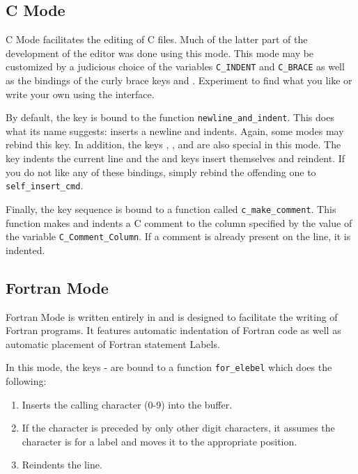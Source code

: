 \subsection{C Mode}

  C Mode facilitates the editing of C files.  Much of the latter part of the
  development of the \jed{} editor was done using this mode.  This mode may be
  customized by a judicious choice of the variables \verb|C_INDENT| and
  \verb|C_BRACE| as well as the bindings of the curly brace keys \var{\{} 
  and \key{\}}.  Experiment to find what you like or write your own using the
  \slang{} interface.

  By default, the  key is bound to the function
  \verb|newline_and_indent|. This does what its name suggests: inserts a
  newline and indents.  Again, some modes may rebind this key.  In addition,
  the keys \var{\{}, \var{\}}, and  are also special in this mode.
  The  key indents the current line and the \var{\{} and \var{\}}
  keys insert themselves and reindent.  If you do not like any of these
  bindings, simply rebind the offending one to \verb|self_insert_cmd|.

  Finally, the key sequence  is bound to a function called
  \verb|c_make_comment|.  This function makes and indents a C comment to the
  column specified by the value of the variable \verb|C_Comment_Column|.  If
  a comment is already present on the line, it is indented.

\subsection{Fortran Mode}

  Fortran Mode is written entirely in \slang{} and is designed to facilitate
  the writing of Fortran programs.  It features automatic indentation of
  Fortran code as well as automatic placement of Fortran statement Labels.

  In this mode, the keys - are bound to a function
  \verb|for_elebel| which does the following:
\begin{itemize} 
\begin{enumerate}
\item Inserts the calling character (0-9) into the buffer.

\item If the character is preceded by only other digit characters, it
      assumes the character is for a label and moves it to the appropriate
      position.

\item Reindents the line.
\end{enumerate}
\end{itemize} 

